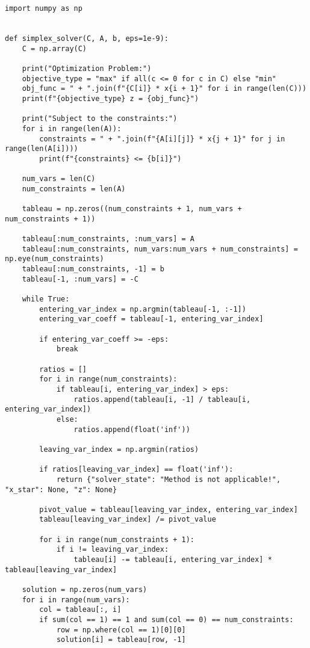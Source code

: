 \documentclass[12pt, legalpaper]{exam}
\begin{document}
\begin{verbatim}
import numpy as np


def simplex_solver(C, A, b, eps=1e-9):
    C = np.array(C)

    print("Optimization Problem:")
    objective_type = "max" if all(c <= 0 for c in C) else "min"
    obj_func = " + ".join(f"{C[i]} * x{i + 1}" for i in range(len(C)))
    print(f"{objective_type} z = {obj_func}")

    print("Subject to the constraints:")
    for i in range(len(A)):
        constraints = " + ".join(f"{A[i][j]} * x{j + 1}" for j in range(len(A[i])))
        print(f"{constraints} <= {b[i]}")

    num_vars = len(C)
    num_constraints = len(A)

    tableau = np.zeros((num_constraints + 1, num_vars + num_constraints + 1))

    tableau[:num_constraints, :num_vars] = A
    tableau[:num_constraints, num_vars:num_vars + num_constraints] = np.eye(num_constraints)
    tableau[:num_constraints, -1] = b
    tableau[-1, :num_vars] = -C

    while True:
        entering_var_index = np.argmin(tableau[-1, :-1])
        entering_var_coeff = tableau[-1, entering_var_index]

        if entering_var_coeff >= -eps:
            break

        ratios = []
        for i in range(num_constraints):
            if tableau[i, entering_var_index] > eps:
                ratios.append(tableau[i, -1] / tableau[i, entering_var_index])
            else:
                ratios.append(float('inf'))

        leaving_var_index = np.argmin(ratios)

        if ratios[leaving_var_index] == float('inf'):
            return {"solver_state": "Method is not applicable!", "x_star": None, "z": None}

        pivot_value = tableau[leaving_var_index, entering_var_index]
        tableau[leaving_var_index] /= pivot_value

        for i in range(num_constraints + 1):
            if i != leaving_var_index:
                tableau[i] -= tableau[i, entering_var_index] * tableau[leaving_var_index]

    solution = np.zeros(num_vars)
    for i in range(num_vars):
        col = tableau[:, i]
        if sum(col == 1) == 1 and sum(col == 0) == num_constraints:
            row = np.where(col == 1)[0][0]
            solution[i] = tableau[row, -1]


\end{verbatim}
\end{document}
